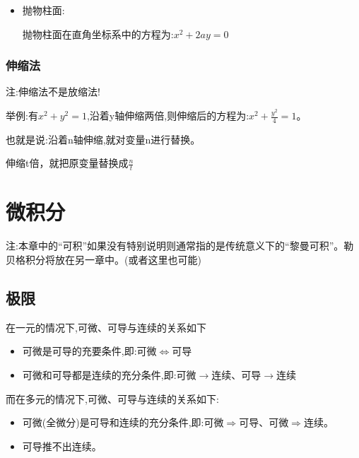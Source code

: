 \documentclass[UTF8]{ctexbook}
\begin{document}
{{{{\begin{itemize}
{\begin{itemize}
{                      双曲柱面在直角坐标系中的方程为:$\frac{x^2}{a^2} - \frac{y^2}{b^2} = 1$
                      }
                \item {
                      抛物柱面:

                      抛物柱面在直角坐标系中的方程为:$x^2 + 2ay = 0$
                      }
              \end{itemize}
              }
      \end{itemize}
    }%

    \subsubsection{伸缩法}{
      注:伸缩法不是放缩法!

      举例:有$x^2 + y^2 = 1$,沿着y轴伸缩两倍,则伸缩后的方程为:$x^2 + \frac{y^2}{4} = 1$。

      也就是说:沿着n轴伸缩,就对变量n进行替换。

      伸缩t倍，就把原变量替换成$\frac{n}{t}$
    }%
  }%

 }%

\section{微积分}{
注:本章中的“可积”如果没有特别说明则通常指的是传统意义下的“黎曼可积”。勒贝格积分将放在另一章中。(或者这里也可能)

\subsection{极限}{

  在一元的情况下,可微、可导与连续的关系如下

  \begin{itemize}
    \item 可微是可导的充要条件,即:可微$\Leftrightarrow$可导
    \item 可微和可导都是连续的充分条件,即:可微$\rightarrow$连续、可导$\rightarrow$连续
  \end{itemize}

  而在多元的情况下,可微、可导与连续的关系如下:

  \begin{itemize}
    \item 可微(全微分)是可导和连续的充分条件,即:可微$\Rightarrow$可导、可微$\Rightarrow$连续。
    \item 可导推不出连续。
  \end{itemize}

}}}
\end{document}
